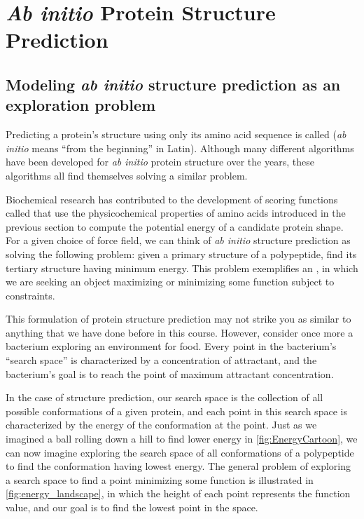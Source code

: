 \FloatBarrier
{}

\section{\textit{Ab initio} Protein Structure Prediction}
\label{sec:ab_initio}

\subsection{Modeling \textit{ab initio} structure prediction as an exploration problem}

Predicting a protein’s structure using only its amino acid sequence is called  (\textit{ab initio} means “from the beginning” in Latin). Although many different algorithms have been developed for \textit{ab initio} protein structure over the years, these algorithms all find themselves solving a similar problem.

Biochemical research has contributed to the development of scoring functions called  that use the physicochemical properties of amino acids introduced in the previous section to compute the potential energy of a candidate protein shape. For a given choice of force field, we can think of \textit{ab initio} structure prediction as solving the following problem: given a primary structure of a polypeptide, find its tertiary structure having minimum energy. This problem exemplifies an , in which we are seeking an object maximizing or minimizing some function subject to constraints.

This formulation of protein structure prediction may not strike you as similar to anything that we have done before in this course. However, consider once more a bacterium exploring an environment for food. Every point in the bacterium's ``search space'' is characterized by a concentration of attractant, and the bacterium's goal is to reach the point of maximum attractant concentration.

In the case of structure prediction, our search space is the collection of all possible conformations of a given protein, and each point in this search space is characterized by the energy of the conformation at the point. Just as we imagined a ball rolling down a hill to find lower energy in \autoref{fig:EnergyCartoon}, we can now imagine exploring the search space of all conformations of a polypeptide to find the conformation having lowest energy. The general problem of exploring a search space to find a point minimizing some function is illustrated in \autoref{fig:energy_landscape}, in which the height of each point represents the function value, and our goal is to find the lowest point in the space.\\

